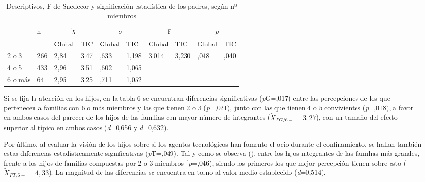 \documentclass{textolivre}
\begin{document}
\begin{table}[htpb]
\caption{Descriptivos, F de Snedecor y significación estadística de los padres, según nº miembros}
\label{tab5}
\centering
\begin{tabular}{llllllllll}
\toprule
& \multirow{2}{*}{n} & \multicolumn{2}{c}{$\tilde{X}$} & \multicolumn{2}{c}{\begin{math}\sigma\end{math}} & \multicolumn{2}{c}{F} & \multicolumn{2}{c}{\emph{p}}
\\
& & Global & TIC & Global & TIC & Global & TIC & Global & TIC
\\
\midrule
2 o 3 & 266 & 2,84 & 3,47 & ,633 & 1,198 & 3,014 & 3,230 & ,048 & ,040
\\
4 o 5 & 433 & 2,96 & 3,51 & ,602 & 1,065 & & & &
\\
6 o más & 64 & 2,95 & 3,25 & ,711 & 1,052 & & & &
\\
\bottomrule
\end{tabular}
\centering
{}
\end{table}

Si se fija la atención en los hijos, en la tabla 6 se encuentran diferencias significativas (\emph{p}G=,017) entre las percepciones de los que pertenecen a familias con 6 o más miembros y las que tienen 2 o 3 (\emph{p}=,021), junto con las que tienen 4 o 5 convivientes (\emph{p}=,018), a favor en ambos casos del parecer de los hijos de las familias con mayor número de integrantes ($\tilde{X}_{PG/6+}=3,27$), con un tamaño del efecto superior al típico en ambos casos (\emph{d}=0,656 y \emph{d}=0,632).

Por último, al evaluar la visión de los hijos sobre si los agentes tecnológicos han fomento el ocio durante el confinamiento, se hallan también estas diferencias estadísticamente significativas (\emph{p}T=,049). Tal y como se observa (), entre los hijos integrantes de las familias más grandes, frente a los hijos de familias compuestas por 2 o 3 miembros (\emph{p}=,046), siendo los primeros los que mejor percepción tienen sobre esto ($\tilde{X}_{PT/6+}=4,33$). La magnitud de las diferencias se encuentra en torno al valor medio establecido (\emph{d}=0,514).
\end{document}
